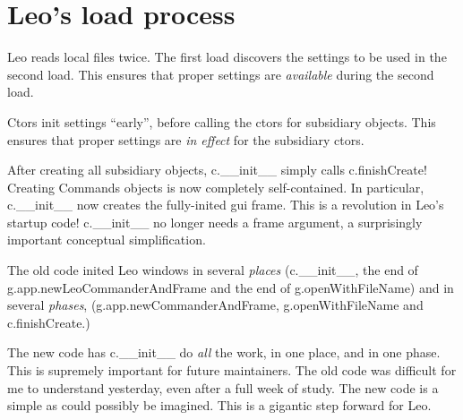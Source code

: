 \documentclass[a4paper,10pt,english]{sphinxmanual}
\begin{document}
\section{Leo's load process}
\label{theory:leo-s-load-process}
Leo reads local files twice. The first load discovers the
settings to be used in the second load. This ensures that
proper settings are \emph{available} during the second load.

Ctors init settings ``early'', before calling the ctors for
subsidiary objects. This ensures that proper settings are
\emph{in effect} for the subsidiary ctors.

After creating all subsidiary objects, c.\_\_init\_\_ simply
calls c.finishCreate! Creating Commands objects is now
completely self-contained. In particular, c.\_\_init\_\_ now
creates the fully-inited gui frame. This is a revolution in
Leo's startup code! c.\_\_init\_\_ no longer needs a frame
argument, a surprisingly important conceptual
simplification.

The old code inited Leo windows in several \emph{places}
(c.\_\_init\_\_, the end of g.app.newLeoCommanderAndFrame and
the end of g.openWithFileName) and in several \emph{phases},
(g.app.newCommanderAndFrame, g.openWithFileName and
c.finishCreate.)

The new code has c.\_\_init\_\_ do \emph{all} the work, in one place,
and in one phase. This is supremely important for future
maintainers. The old code was difficult for me to understand
yesterday, even after a full week of study. The new code is
a simple as could possibly be imagined. This is a gigantic
step forward for Leo.
\end{document}
